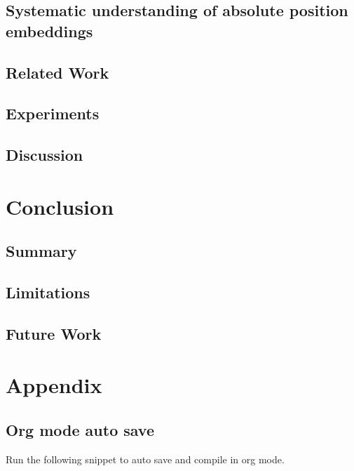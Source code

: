 \documentclass[letterpaper, 12pt]{report}
\begin{document}
\section{Systematic understanding of absolute position embeddings}
\label{sec:orgf8ea1d9}
\section{Related Work}
\label{sec:org05c8af6}
\section{Experiments}
\label{sec:orgc6f5de8}


\section{Discussion}
\label{sec:orgbc43cdd}
\clearpage
\chapter{Conclusion}
\label{sec:org8fd280e}
\section{Summary}
\label{sec:org94aab9a}
\section{Limitations}
\label{sec:org217d56a}
\section{Future Work}
\label{sec:org9de237c}

\clearpage





\printglossaries

\chapter{Appendix}
\label{sec:orgd5099eb}
\section{Org mode auto save}
\label{sec:orgde5798f}
Run the following snippet to auto save and compile in org mode.
\end{document}
